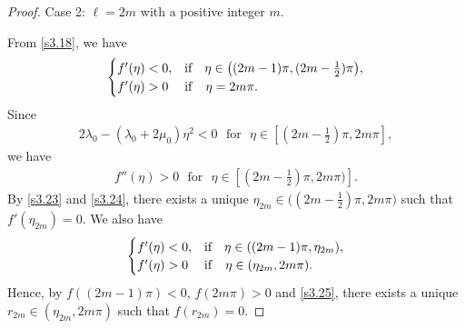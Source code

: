 \documentclass[a4paper,12pt]{article}
\newtheorem{a priori condition}[Th]{A priori condition}
\begin{document}
\begin{proof}
\medskip\noindent
Case 2: $\ell=2m$ with a positive integer $m$.

From \eqref{s3.18}, we have 
\begin{equation}\label{s3.23}
\begin{array}{l}
\begin{cases}
f'(\eta)<0,&\mbox{\rm if}\quad \eta\in\big((2m-1)\pi, (2m-\frac{1}{2})\pi\big),\\
f'(\eta)>0    & {\rm if}\quad \eta=2m\pi.
\end{cases}
\end{array}
\end{equation}
Since
\begin{equation*}
\begin{aligned}
2\lambda_0-(\lambda_0+2\mu_0)\eta^2<0\,\,\,\,\text{for}\,\,\,\,
\eta\in[(2m-\frac{1}{2})\pi,2m\pi],
\end{aligned}
\end{equation*}
we have
\begin{equation}\label{s3.24}
\begin{aligned}
f''(\eta)>0\,\,\,\,\text{for}\,\,\,\,\eta\in[(2m-\frac{1}{2})\pi,2m\pi)].
\end{aligned}
\end{equation}
By \eqref{s3.23} and \eqref{s3.24}, there exists a unique $\eta_{2m}\in \big((2m-\frac{1}{2})\pi,2m\pi\big)$ such that $f'(\eta_{2m})=0$. We also have
\begin{equation}\label{s3.25}
\begin{array}{l}
\begin{cases}
f'(\eta)<0,&\mbox{\rm if}\quad \eta\in((2m-1)\pi, \eta_{2m}),\\
f'(\eta)>0    & {\rm if}\quad \eta\in(\eta_{2m}, 2m\pi).
\end{cases}
\end{array}
\end{equation}
Hence, by $f((2m-1)\pi)< 0$, $f(2m\pi)> 0$ and \eqref{s3.25}, there exists a unique $r_{2m}\in (\eta_{2m},2m\pi)$ such that $f(r_{2m})=0$.

\end{proof}
\end{document}
